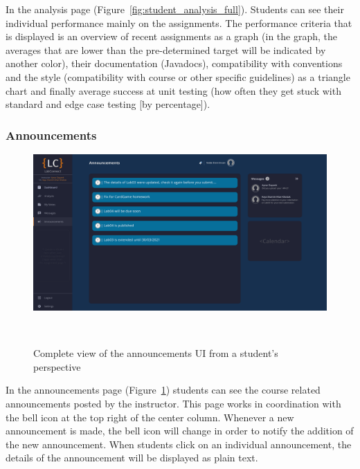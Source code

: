 \documentclass[a4paper, 12pt]{article}
\begin{document}
    In the analysis page (Figure~\ref{fig:student_analysis_full}). Students can see their individual performance mainly on the assignments.
    The performance criteria that is displayed is an overview of recent assignments as a graph (in the graph, the averages that are lower than the 
    pre-determined target will be indicated by another color), their documentation (Javadocs), compatibility with conventions and the style 
    (compatibility with course or other specific guidelines) as a triangle chart and finally average success at unit testing (how often they 
    get stuck with standard and edge case testing [by percentage]).

    
    \pagebreak
    
    \subsubsection{Announcements}
    
    \begin{figure}[H]
        \centering
        \includegraphics[width=\textwidth]{student_announcements}
        \caption{Complete view of the announcements UI from a student's perspective}~\label{fig:student_announcements_full}
    \end{figure}
    
    In the announcements page (Figure~\ref{fig:student_announcements_full}) students can see the course related announcements posted by the instructor. 
    This page works in coordination with the bell icon at the top right of the center column. 
    Whenever a new announcement is made, the bell icon will change in order to notify the addition of the 
    new announcement. When students click on an individual announcement, the details of the announcement will be displayed as plain text.
    
    
    \pagebreak
    
\end{document}
